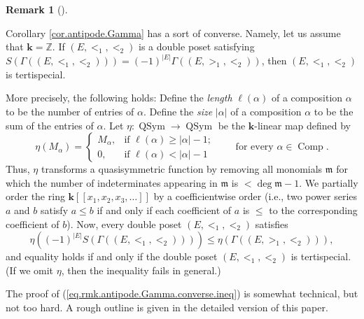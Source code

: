 \documentclass[numbers=enddot,12pt,final,onecolumn,notitlepage,abstracton]{scrartcl}
\theoremstyle{definition}
\newtheorem{remk}[theo]{Remark}
\newenvironment{remark}[1][]
{\begin{remk}[#1]\begin{leftbar}}
{\end{leftbar}\end{remk}}
\newenvironment{vershort}{}{}
\newcommand{\kk}{{\mathbf{k}}}
\newcommand{\Comp}{{\operatorname{Comp}}}
\newcommand{\QSym}{{\operatorname{QSym}}}
\newcommand{\ZZ}{{\mathbb{Z}}}
\begin{document}
\begin{remark}
\label{rmk.antipode.Gamma.converse}
Corollary \ref{cor.antipode.Gamma} has a
sort of converse. Namely, let us assume that $\kk = \ZZ$. If
$\left(  E,<_{1},<_{2}\right)  $ is a double poset satisfying $S\left(
\Gamma\left(  \left(  E,<_{1},<_{2}\right)  \right)  \right)  =\left(
-1\right)  ^{\left\vert E\right\vert }\Gamma\left(  \left(  E,>_{1}%
,<_{2}\right)  \right)  $, then $\left(  E,<_{1},<_{2}\right)  $ is tertispecial.

More precisely, the following holds: Define the \textit{length} $\ell\left(
\alpha\right)  $ of a composition $\alpha$ to be the number of entries of
$\alpha$. Define the \textit{size} $\left\vert \alpha\right\vert $ of a
composition $\alpha$ to be the sum of the entries of $\alpha$. Let
$\eta : \QSym \to \QSym$ be the $\kk$-linear map defined by
\[
\eta \left( M_{\alpha} \right)
=
\begin{cases}
M_{\alpha}, & \text{if }\ell\left(  \alpha\right)  \geq\left\vert
\alpha\right\vert -1;\\
0, & \text{if }\ell\left(  \alpha\right)  <\left\vert \alpha\right\vert -1
\end{cases}
\qquad \text{for every } \alpha \in \Comp .
\]
Thus, $\eta$ transforms a quasisymmetric function by removing all monomials
$\mathfrak{m}$ for which the number of indeterminates appearing in
$\mathfrak{m}$ is $<\deg\mathfrak{m}-1$. We partially order the ring
$\kk \left[  \left[ x_1, x_2, x_3, \ldots \right]  \right]  $
by a coefficientwise
order (i.e., two power series $a$ and $b$ satisfy $a\leq b$ if and only if
each coefficient of $a$ is $\leq$ to the corresponding coefficient of $b$).
Now, every double poset $\left(  E,<_{1},<_{2}\right)  $ satisfies
\begin{equation}
\eta\left(  \left(  -1\right)  ^{\left\vert E\right\vert }S\left(
\Gamma\left(  \left(  E,<_{1},<_{2}\right)  \right)  \right)  \right)
\leq\eta\left(  \Gamma\left(  \left(  E,>_{1},<_{2}\right)  \right)  \right)
,\label{eq.rmk.antipode.Gamma.converse.ineq}
\end{equation}
and equality holds if and only if the double poset
$\left( E, <_{1}, <_{2} \right)  $ is tertispecial.
(If we omit $\eta$, then the inequality fails in general.)

\begin{vershort}
The proof of (\ref{eq.rmk.antipode.Gamma.converse.ineq}) is somewhat
technical, but not too hard. A rough outline is given in the detailed
version of this paper.
\end{vershort}


\end{remark}
\end{document}
